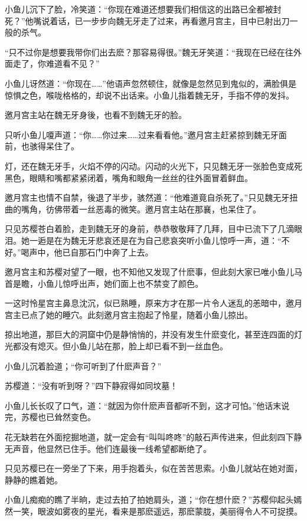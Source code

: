 \documentclass[12pt,oneside]{book}
\begin{document}
小鱼儿沉下了脸，冷笑道：``你现在难道还想要我们相信这的出路已全都被封死？''他嘴说着话，已一步步向魏无牙走了过来，再看邀月宫主，目中已射出刀一般的杀气。

``只不过你是想要我带你们出去麽？那容易得很。''魏无牙笑道：``我现在已经在往外面走了，你难道看不见？''

小鱼儿讶然道：``你现在\ldots\ldots{}''他语声忽然顿住，就像是忽然见到鬼似的，满脸俱是惊惧之色，喉咙格格的，却说不出话来。小鱼儿指着魏无牙，手指不停的发抖。

邀月宫主站在魏无牙身後，也看不到魏无牙的脸。

只听小鱼儿嗄声道：``你\ldots\ldots 你过来\ldots\ldots 过来看看他。''邀月宫主赶紧掠到魏无牙面前，也骇得呆住了。

灯，还在魏无牙手，火焰不停的闪动。闪动的火光下，只见魏无牙一张脸色变成死黑色，眼睛和嘴都紧紧闭着，嘴角和眼角一丝丝的往外面冒着鲜血。

邀月宫主也情不自禁，後退了半步，骇然道：``他难道竟自杀死了。''只见魏无牙扭曲的嘴角，彷佛带着一丝恶毒的微笑。邀月宫主站在那襄，也呆住了。

只见苏樱苍白着脸，走到魏无牙的身前，恭恭敬敬拜了几拜，目中已流下了几滴眼泪。她一逅是在为魏无牙悲哀还是在为自己悲哀突听小鱼儿惊呼一声，道：``不好。''喝声中，他已自那石门中奔了上去。

邀月宫主和苏樱对望了一眼，也不知他又发现了什麽事，但此刻大家已唯小鱼儿马首是瞻，小鱼儿惊呼出声，她们面上也不禁变了颜色。

一这时怜星宫主鼻息沈沉，似已熟睡，原来方才在那一片令人迷乱的恙暗中，邀月宫主已点了她的睡穴。此刻邀月宫主抱起了怜星，随着小鱼儿掠出。

掠出地道，那巨大的洞窟中仍是静悄悄的，并没有发生什麽变化，甚至连四面的灯光都没有熄灭。但小鱼儿站在那，脸上却已看不到一丝血色。

小鱼儿沉着脸道；``你可听到了什麽声音？''

苏樱道：``没有听到呀？''四下静寂得如同坟墓！

小鱼儿长长叹了口气，道：``就因为你什麽声音都听不到，这才可怕。''他话末说完，苏樱也已耸然变色。

花无缺若在外面挖掘地道，就一定会有``叫叫咚咚''的敲石声传进来，但此刻四下静无声音，他显然已住手。他们连最後一线希望都断绝了。

只见苏樱已在一旁坐了下来，用手抱着头，似在苦苦思索。小鱼儿就站在她对面，静静的瞧着她。

小鱼儿痴痴的瞧了半晌，走过去拍了拍她肩头，道；``你在想什麽？''苏樱仰起头嫣然一笑，眼波如雾夜的星光，看来是那麽遥远，那麽蒙胧，美丽得令人不可捉摸。
\end{document}
